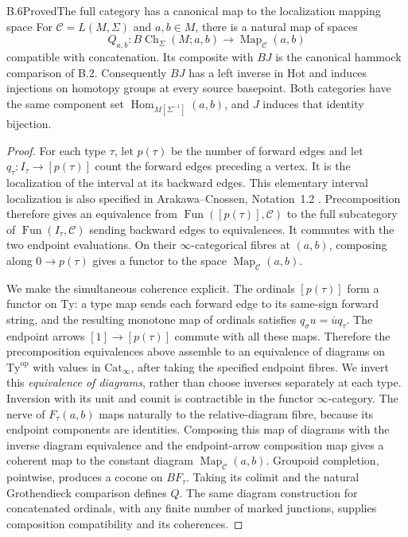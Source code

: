 \begin{result}{B.6}{Proved}{The full category has a canonical map to the localization mapping space}
For $\mathcal C=L(M,\Sigma)$ and $a,b\in M$, there is a natural map of spaces
\[
 Q_{a,b}:B\operatorname{Ch}_\Sigma(M;a,b)
           \longrightarrow\operatorname{Map}_{\mathcal C}(a,b)
\]
compatible with concatenation. Its composite with $BJ$ is the canonical hammock comparison of B.2. Consequently $BJ$ has a left inverse in $\mathrm{Hot}$ and induces injections on homotopy groups at every source basepoint. Both categories have the same component set
$\operatorname{Hom}_{M[\Sigma^{-1}]}(a,b)$, and $J$ induces that identity bijection.
\end{result}
\begin{proof}
For each type $\tau$, let $p(\tau)$ be the number of forward edges and let
$q_\tau:I_\tau\to[p(\tau)]$ count the forward edges preceding a vertex. It is the localization of the interval at its backward edges. This elementary interval localization is also specified in Arakawa--Cnossen, Notation~1.2 \citep{ArakawaCnossenPATHS}. Precomposition therefore gives an equivalence from $\operatorname{Fun}([p(\tau)],\mathcal C)$ to the full subcategory of $\operatorname{Fun}(I_\tau,\mathcal C)$ sending backward edges to equivalences. It commutes with the two endpoint evaluations. On their $\infty$-categorical fibres at $(a,b)$, composing along $0\to p(\tau)$ gives a functor to the space $\operatorname{Map}_{\mathcal C}(a,b)$.

We make the simultaneous coherence explicit. The ordinals $[p(\tau)]$ form a functor on $\mathrm{Ty}$: a type map sends each forward edge to its same-sign forward string, and the resulting monotone map of ordinals satisfies $q_\sigma u=\overline u q_\tau$. The endpoint arrows $[1]\to[p(\tau)]$ commute with all these maps. Therefore the precomposition equivalences above assemble to an equivalence of diagrams on $\mathrm{Ty}^{\mathrm{op}}$ with values in $\mathrm{Cat}_\infty$, after taking the specified endpoint fibres. We invert this \emph{equivalence of diagrams}, rather than choose inverses separately at each type. Inversion with its unit and counit is contractible in the functor $\infty$-category. The nerve of $F_\tau(a,b)$ maps naturally to the relative-diagram fibre, because its endpoint components are identities. Composing this map of diagrams with the inverse diagram equivalence and the endpoint-arrow composition map gives a coherent map to the constant diagram $\operatorname{Map}_{\mathcal C}(a,b)$. Groupoid completion, pointwise, produces a cocone on $BF_\tau$. Taking its colimit and the natural Grothendieck comparison defines $Q$. The same diagram construction for concatenated ordinals, with any finite number of marked junctions, supplies composition compatibility and its coherences.


\end{proof}
